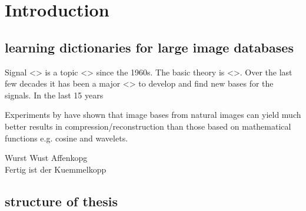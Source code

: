 \chapter{Introduction}
\label{sec:introduction}
\section{learning dictionaries for large image databases}
Signal <> is a topic <> since the 1960s. The basic theory is <>. Over the last few decades it has been
a major <> to develop and find new bases for the signals. In the last 15 years 


Experiments by \cite{} have shown \cite{} that image bases from natural images can yield much better results in compression/reconstruction than
those based on mathematical functions e.g. cosine and wavelets.


\cite{Mairal2010Online} Wurst Wust Affenkopg \\
Fertig ist der Kuemmelkopp


\section{structure of thesis}

